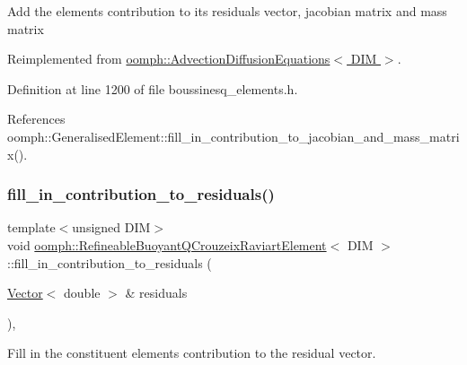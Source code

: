 Add the element\textquotesingle{}s contribution to its residuals vector, jacobian matrix and mass matrix 

Reimplemented from \hyperlink{classoomph_1_1AdvectionDiffusionEquations_aed50fe00556434c01bc855766edeb564}{oomph\+::\+Advection\+Diffusion\+Equations$<$ D\+I\+M $>$}.



Definition at line 1200 of file boussinesq\+\_\+elements.\+h.



References oomph\+::\+Generalised\+Element\+::fill\+\_\+in\+\_\+contribution\+\_\+to\+\_\+jacobian\+\_\+and\+\_\+mass\+\_\+matrix().

\mbox{\label{classoomph_1_1RefineableBuoyantQCrouzeixRaviartElement_a102b3aeb79d9af430b9ce0a7c8d5bd33}} 
\subsubsection{\texorpdfstring{fill\+\_\+in\+\_\+contribution\+\_\+to\+\_\+residuals()}{fill\_in\_contribution\_to\_residuals()}}
{\footnotesize\ttfamily template$<$unsigned D\+IM$>$ \\
void \hyperlink{classoomph_1_1RefineableBuoyantQCrouzeixRaviartElement}{oomph\+::\+Refineable\+Buoyant\+Q\+Crouzeix\+Raviart\+Element}$<$ D\+IM $>$\+::fill\+\_\+in\+\_\+contribution\+\_\+to\+\_\+residuals (\begin{DoxyParamCaption}\item[{\hyperlink{classoomph_1_1Vector}{Vector}$<$ double $>$ \&}]{residuals }\end{DoxyParamCaption})\hspace{0.3cm}{\ttfamily [inline]}, {\ttfamily [virtual]}}



Fill in the constituent elements\textquotesingle{} contribution to the residual vector. 




